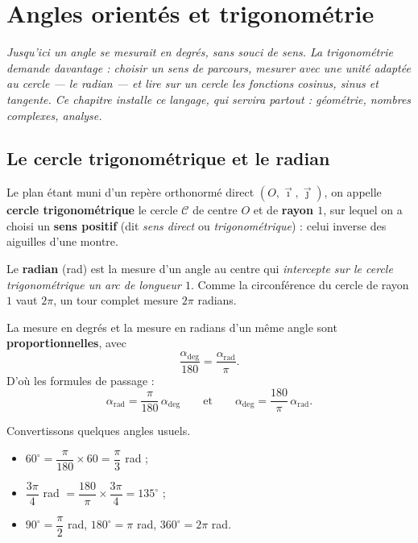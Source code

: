 \chapter{Angles orientés et trigonométrie}
\textit{Jusqu'ici un angle se mesurait en degrés, sans souci de sens. La
trigonométrie demande davantage : choisir un \emph{sens} de parcours, mesurer
avec une unité adaptée au cercle — le \emph{radian} — et lire sur un cercle les
fonctions cosinus, sinus et tangente. Ce chapitre installe ce langage, qui
servira partout : géométrie, nombres complexes, analyse.}

\section{Le cercle trigonométrique et le radian}

\begin{definition}
Le plan étant muni d'un repère orthonormé direct $(O,\vec{\imath},\vec{\jmath})$,
on appelle \textbf{cercle trigonométrique} le cercle $\mathcal{C}$ de centre $O$
et de \textbf{rayon $1$}, sur lequel on a choisi un \textbf{sens positif} (dit
\emph{sens direct} ou \emph{trigonométrique}) : celui inverse des aiguilles d'une
montre.
\end{definition}

\begin{definition}[Le radian]
Le \textbf{radian} (rad) est la mesure d'un angle au centre qui \emph{intercepte
sur le cercle trigonométrique un arc de longueur $1$}. Comme la circonférence du
cercle de rayon $1$ vaut $2\pi$, un tour complet mesure $2\pi$ radians.
\end{definition}

\begin{propriete}
La mesure en degrés et la mesure en radians d'un même angle sont
\textbf{proportionnelles}, avec
\[ \frac{\alpha_{\deg}}{180}=\frac{\alpha_{\mathrm{rad}}}{\pi}. \]
D'où les formules de passage :
\[ \alpha_{\mathrm{rad}}=\frac{\pi}{180}\,\alpha_{\deg}
   \qquad\text{et}\qquad
   \alpha_{\deg}=\frac{180}{\pi}\,\alpha_{\mathrm{rad}}. \]
\end{propriete}

\begin{exemple}
Convertissons quelques angles usuels.
\begin{itemize}
  \item $60^\circ = \dfrac{\pi}{180}\times 60 = \dfrac{\pi}{3}$ rad ;
  \item $\dfrac{3\pi}{4}$ rad $= \dfrac{180}{\pi}\times\dfrac{3\pi}{4}=135^\circ$ ;
  \item $90^\circ=\dfrac{\pi}{2}$ rad, $180^\circ=\pi$ rad, $360^\circ=2\pi$ rad.
\end{itemize}
\end{exemple}

